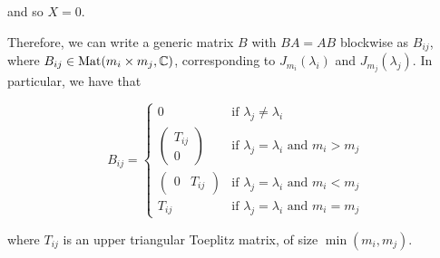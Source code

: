 \documentclass{article}
\begin{document}
and so \(X = 0\).

Therefore, we can write a generic matrix \(B\) with \(BA = AB\) blockwise as \(B_{ij}\), where \(B_{ij} \in \operatorname{Mat}(m_i \times m_j, \mathbb{C})\), corresponding to \(J_{m_i}(\lambda_i)\) and \(J_{m_j}(\lambda_j)\). In particular, we have that

\[B_{ij} = \begin{cases}
    0 & \text{if }\lambda_j \ne \lambda_i \\
    \begin{pmatrix}
        T_{ij} \\ 0
    \end{pmatrix} & \text{if } \lambda_j = \lambda_i \text{ and } m_i > m_j \\
    \begin{pmatrix}
        0 & T_{ij}
    \end{pmatrix} & \text{if } \lambda_j = \lambda_i \text{ and } m_i < m_j \\
    T_{ij} & \text{if } \lambda_j = \lambda_i \text{ and } m_i = m_j
\end{cases}\]

where \(T_{ij}\) is an upper triangular Toeplitz matrix, of size \(\min(m_i, m_j)\).
\end{document}

